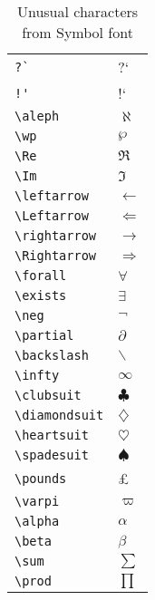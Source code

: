 \documentclass{article}
\begin{document}
\begin{table}
\begin{center}
\begin{tabular}{ll}
\verb#?`# & ?` \\
\verb#!'# & !` \\
\verb#\aleph# & $\aleph$\\
\verb#\wp# & $\wp$\\
\verb#\Re# & $\Re$\\
\verb#\Im# & $\Im$\\
\verb#\leftarrow# & $\leftarrow$\\
\verb#\Leftarrow# & $\Leftarrow$\\
\verb#\rightarrow# & $\rightarrow$\\
\verb#\Rightarrow# & $\Rightarrow$\\
\verb#\forall# & $\forall$\\
\verb#\exists# & $\exists$\\
\verb#\neg# & $\neg$\\
\verb#\partial# & $\partial$\\
\verb#\backslash# & $\backslash$\\
\verb#\infty# & $\infty$\\
\verb#\clubsuit# & $\clubsuit$\\
\verb#\diamondsuit# & $\diamondsuit$\\
\verb#\heartsuit# & $\heartsuit$\\
\verb#\spadesuit# & $\spadesuit$\\
\verb#\pounds# & \pounds\\
\verb#\varpi# & $\varpi$\\
\verb#\alpha# & $\alpha$\\
\verb#\beta# & $\beta$\\
\verb#\sum# & $\sum$\\
\verb#\prod# & $\prod$
\end{tabular}
\caption{Unusual characters from Symbol font}
\end{center}
\end{table}
\end{document}
